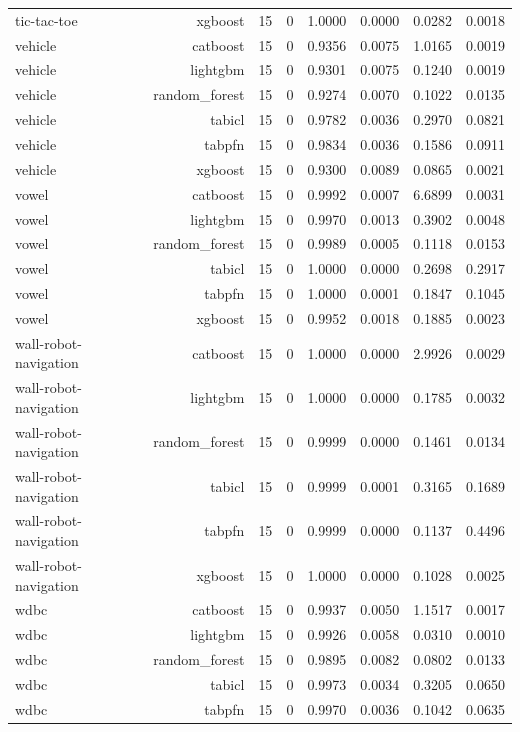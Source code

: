\begin{table}[htbp]
\begin{tabular}{lrrrrrrr}
tic-tac-toe & xgboost & 15 & 0 & 1.0000 & 0.0000 & 0.0282 & 0.0018 \\
vehicle & catboost & 15 & 0 & 0.9356 & 0.0075 & 1.0165 & 0.0019 \\
vehicle & lightgbm & 15 & 0 & 0.9301 & 0.0075 & 0.1240 & 0.0019 \\
vehicle & random\_forest & 15 & 0 & 0.9274 & 0.0070 & 0.1022 & 0.0135 \\
vehicle & tabicl & 15 & 0 & 0.9782 & 0.0036 & 0.2970 & 0.0821 \\
vehicle & tabpfn & 15 & 0 & 0.9834 & 0.0036 & 0.1586 & 0.0911 \\
vehicle & xgboost & 15 & 0 & 0.9300 & 0.0089 & 0.0865 & 0.0021 \\
vowel & catboost & 15 & 0 & 0.9992 & 0.0007 & 6.6899 & 0.0031 \\
vowel & lightgbm & 15 & 0 & 0.9970 & 0.0013 & 0.3902 & 0.0048 \\
vowel & random\_forest & 15 & 0 & 0.9989 & 0.0005 & 0.1118 & 0.0153 \\
vowel & tabicl & 15 & 0 & 1.0000 & 0.0000 & 0.2698 & 0.2917 \\
vowel & tabpfn & 15 & 0 & 1.0000 & 0.0001 & 0.1847 & 0.1045 \\
vowel & xgboost & 15 & 0 & 0.9952 & 0.0018 & 0.1885 & 0.0023 \\
wall-robot-navigation & catboost & 15 & 0 & 1.0000 & 0.0000 & 2.9926 & 0.0029 \\
wall-robot-navigation & lightgbm & 15 & 0 & 1.0000 & 0.0000 & 0.1785 & 0.0032 \\
wall-robot-navigation & random\_forest & 15 & 0 & 0.9999 & 0.0000 & 0.1461 & 0.0134 \\
wall-robot-navigation & tabicl & 15 & 0 & 0.9999 & 0.0001 & 0.3165 & 0.1689 \\
wall-robot-navigation & tabpfn & 15 & 0 & 0.9999 & 0.0000 & 0.1137 & 0.4496 \\
wall-robot-navigation & xgboost & 15 & 0 & 1.0000 & 0.0000 & 0.1028 & 0.0025 \\
wdbc & catboost & 15 & 0 & 0.9937 & 0.0050 & 1.1517 & 0.0017 \\
wdbc & lightgbm & 15 & 0 & 0.9926 & 0.0058 & 0.0310 & 0.0010 \\
wdbc & random\_forest & 15 & 0 & 0.9895 & 0.0082 & 0.0802 & 0.0133 \\
wdbc & tabicl & 15 & 0 & 0.9973 & 0.0034 & 0.3205 & 0.0650 \\
wdbc & tabpfn & 15 & 0 & 0.9970 & 0.0036 & 0.1042 & 0.0635 \\

\end{tabular}
\end{table}
